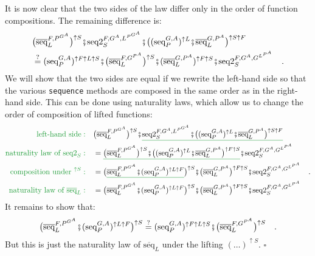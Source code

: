 It is now clear that the two sides of the law differ only in the order
of function compositions. The remaining difference is:
\begin{align*}
 & \big(\overline{\text{seq}}_{L}^{F,P^{G^{A}}}\big)^{\uparrow S}\bef\text{seq2}_{S}^{F,G^{A},L^{P^{G^{A}}}}\bef\big((\text{seq}_{P}^{G,A})^{\uparrow L}\bef\overline{\text{seq}}_{L}^{G,P^{A}}\big)^{\uparrow S\uparrow F}\\
 & \overset{?}{=}(\text{seq}_{P}^{G,A})^{\uparrow F\uparrow L\uparrow S}\bef\big(\overline{\text{seq}}_{L}^{F,G^{P^{A}}}\big)^{\uparrow S}\bef(\overline{\text{seq}}_{L}^{G,P^{A}})^{\uparrow F\uparrow S}\bef\text{seq2}_{S}^{F,G^{A},G^{L^{P^{A}}}}\quad.
\end{align*}
We will show that the two sides are equal if we rewrite the left-hand
side so that the various \lstinline!sequence! methods are composed
in the same order as in the right-hand side. This can be done using
naturality laws, which allow us to change the order of composition
of lifted functions:
\begin{align*}
{\color{greenunder}\text{left-hand side}:}\quad & \big(\overline{\text{seq}}_{L}^{F,P^{G^{A}}}\big)^{\uparrow S}\bef\gunderline{\text{seq2}_{S}^{F,G^{A},L^{P^{G^{A}}}}\bef\big((\text{seq}_{P}^{G,A})^{\uparrow L}\bef\overline{\text{seq}}_{L}^{G,P^{A}}\big)^{\uparrow S\uparrow F}}\\
{\color{greenunder}\text{naturality law of }\text{seq2}_{S}:}\quad & =\gunderline{\big(\overline{\text{seq}}_{L}^{F,P^{G^{A}}}\big)^{\uparrow S}\bef\big((\text{seq}_{P}^{G,A})^{\uparrow L}\bef\overline{\text{seq}}_{L}^{G,P^{A}}\big)^{\uparrow F\uparrow S}}\bef\text{seq2}_{S}^{F,G^{A},G^{L^{P^{A}}}}\\
{\color{greenunder}\text{composition under }^{\uparrow S}:}\quad & =\big(\gunderline{\overline{\text{seq}}_{L}^{F,P^{G^{A}}}\bef(\text{seq}_{P}^{G,A})^{\uparrow L\uparrow F}}\big)^{\uparrow S}\bef\big(\overline{\text{seq}}_{L}^{G,P^{A}}\big)^{\uparrow F\uparrow S}\bef\text{seq2}_{S}^{F,G^{A},G^{L^{P^{A}}}}\quad.\\
{\color{greenunder}\text{naturality law of }\overline{\text{seq}}_{L}:}\quad & =\big(\overline{\text{seq}}_{L}^{F,P^{G^{A}}}\bef(\text{seq}_{P}^{G,A})^{\uparrow L\uparrow F}\big)^{\uparrow S}\bef\big(\overline{\text{seq}}_{L}^{G,P^{A}}\big)^{\uparrow F\uparrow S}\bef\text{seq2}_{S}^{F,G^{A},G^{L^{P^{A}}}}
\end{align*}
It remains to show that: 
\[
\big(\overline{\text{seq}}_{L}^{F,P^{G^{A}}}\bef(\text{seq}_{P}^{G,A})^{\uparrow L\uparrow F}\big)^{\uparrow S}\overset{?}{=}(\text{seq}_{P}^{G,A})^{\uparrow F\uparrow L\uparrow S}\bef\big(\overline{\text{seq}}_{L}^{F,G^{P^{A}}}\big)^{\uparrow S}\quad.
\]
But this is just the naturality law of $\overline{\text{seq}}_{L}$
under the lifting $(\dots)^{\uparrow S}$. $\square$

